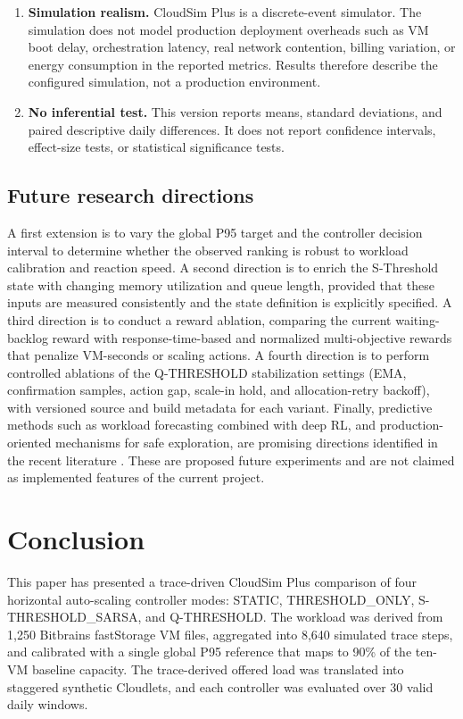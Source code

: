 \documentclass[pdflatex,sn-mathphys-num]{sn-jnl}
\begin{document}
\begin{enumerate}[leftmargin=1.8em]
  \item \textbf{Simulation realism.} CloudSim Plus is a discrete-event simulator. The simulation does not model production deployment overheads such as VM boot delay, orchestration latency, real network contention, billing variation, or energy consumption in the reported metrics. Results therefore describe the configured simulation, not a production environment.
  \item \textbf{No inferential test.} This version reports means, standard deviations, and paired descriptive daily differences. It does not report confidence intervals, effect-size tests, or statistical significance tests.
\end{enumerate}

\subsection{Future research directions}

A first extension is to vary the global P95 target and the controller decision interval to determine whether the observed ranking is robust to workload calibration and reaction speed. A second direction is to enrich the S-Threshold state with changing memory utilization and queue length, provided that these inputs are measured consistently and the state definition is explicitly specified. A third direction is to conduct a reward ablation, comparing the current waiting-backlog reward with response-time-based and normalized multi-objective rewards that penalize VM-seconds or scaling actions. A fourth direction is to perform controlled ablations of the Q-THRESHOLD stabilization settings (EMA, confirmation samples, action gap, scale-in hold, and allocation-retry backoff), with versioned source and build metadata for each variant. Finally, predictive methods such as workload forecasting combined with deep RL, and production-oriented mechanisms for safe exploration, are promising directions identified in the recent literature \cite{machiraju2026survey,qiu2023aware,lipari2025forecast}. These are proposed future experiments and are not claimed as implemented features of the current project.

\section{Conclusion}\label{sec:conclusion}

This paper has presented a trace-driven CloudSim Plus comparison of four horizontal auto-scaling controller modes: STATIC, THRESHOLD\_ONLY, S-THRESHOLD\_SARSA, and Q-THRESHOLD. The workload was derived from 1,250 Bitbrains fastStorage VM files, aggregated into 8,640 simulated trace steps, and calibrated with a single global P95 reference that maps to 90\% of the ten-VM baseline capacity. The trace-derived offered load was translated into staggered synthetic Cloudlets, and each controller was evaluated over 30 valid daily windows.
\end{document}
